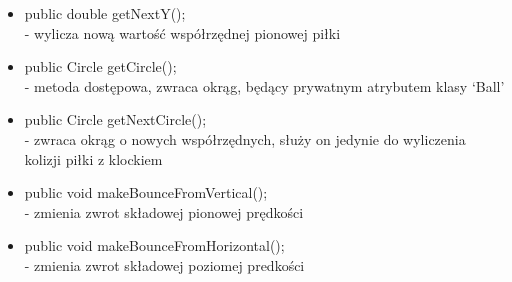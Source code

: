 \documentclass[a4paper]{article}
\begin{document}
\begin{itemize}
\item public double getNextY();\\
- wylicza nową wartość współrzędnej pionowej piłki
    
\item public Circle getCircle();\\
- metoda dostępowa, zwraca okrąg, będący prywatnym atrybutem klasy ‘Ball’
    
\item public Circle getNextCircle();\\
- zwraca okrąg o nowych współrzędnych, służy on jedynie do wyliczenia kolizji piłki z klockiem
   
\item public void makeBounceFromVertical();\\
- zmienia zwrot składowej pionowej prędkości
    
\item public void makeBounceFromHorizontal();\\
- zmienia zwrot składowej poziomej predkości

\end{itemize}
\bigskip
\end{document}
